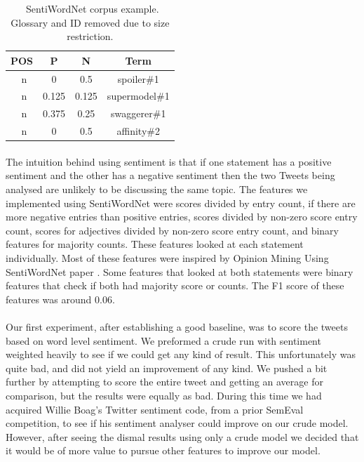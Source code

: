 \documentclass[11pt,letterpaper]{article}
\begin{document}
\begin{table}
\begin{center}
\begin{tabularx}{183pt}{|c|c|c|c|}
\hline
\bf POS & \bf P & \bf N & \bf Term \\ 
\hline
\ n & 0 & 0.5 & spoiler\#1 \\
\ n & 0.125 & 0.125 & supermodel\#1 \\
\ n & 0.375 & 0.25 & swaggerer\#1 \\
\ n & 0 & 0.5 & affinity\#2 \\
\hline
\end{tabularx}
\end{center}
\caption{\label{sentiword-table} ~SentiWordNet corpus example. Glossary and ID removed due to size restriction. }
\end{table}

\paragraph{}
The intuition behind using sentiment is that if one statement has a positive sentiment and the other has a negative sentiment then the two Tweets being analysed are unlikely to be discussing the same topic. The features we implemented using SentiWordNet were scores divided by entry count, if there are more negative entries than positive entries, scores divided by non-zero score entry count, scores for adjectives divided by non-zero score entry count, and binary features for majority counts. These features looked at each statement individually. Most of these features were inspired by Opinion Mining Using SentiWordNet paper \cite{Paraphrase-Identification}.
Some features that looked at both statements were binary features that check if both had majority score or counts. The F1 score of these features was around 0.06.
\paragraph{}
Our first experiment, after establishing a good baseline, was to score the tweets based on word level sentiment. We preformed a crude run with sentiment weighted heavily to see if we could get any kind of result. This unfortunately was quite bad, and did not yield an improvement of any kind. We pushed a bit further by attempting to score the entire tweet and getting an average for comparison, but the results were equally as bad. During this time we had acquired Willie Boag's Twitter sentiment code, from a prior SemEval competition, to see if his sentiment analyser could improve on our crude model. However, after seeing the dismal results using only a crude model we decided that it would be of more value to pursue other features to improve our model.
\end{document}
